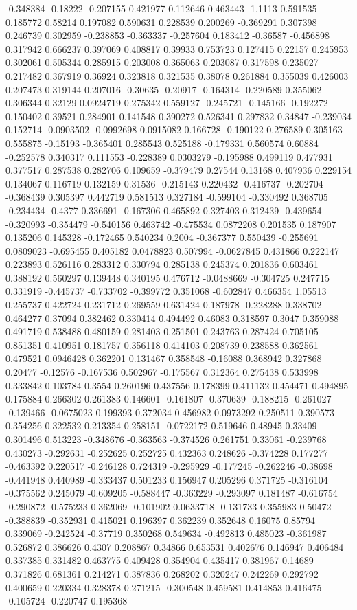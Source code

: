 -0.348384 -0.18222 -0.207155 0.421977 0.112646 0.463443 -1.1113 0.591535 0.185772 0.58214 0.197082 0.590631 0.228539 0.200269 -0.369291 0.307398 0.246739 0.302959 -0.238853 -0.363337 -0.257604 0.183412 -0.36587 -0.456898 0.317942 0.666237 0.397069 0.408817 0.39933 0.753723 0.127415 0.22157 0.245953 0.302061 0.505344 0.285915 0.203008 0.365063 0.203087 0.317598 0.235027 0.217482 0.367919 0.36924 0.323818 0.321535 0.38078 0.261884 0.355039 0.426003 0.207473 0.319144 0.207016 -0.30635 -0.20917 -0.164314 -0.220589 0.355062 0.306344 0.32129 0.0924719 0.275342 0.559127 -0.245721 -0.145166 -0.192272 0.150402 0.39521 0.284901 0.141548 0.390272 0.526341 0.297832 0.34847 -0.239034 0.152714 -0.0903502 -0.0992698 0.0915082 0.166728 -0.190122 0.276589 0.305163 0.555875 -0.15193 -0.365401 0.285543 0.525188 -0.179331 0.560574 0.60884 -0.252578 0.340317 0.111553 -0.228389 0.0303279 -0.195988 0.499119 0.477931 0.377517 0.287538 0.282706 0.109659 -0.379479 0.27544 0.13168 0.407936 0.229154 0.134067 0.116719 0.132159 0.31536 -0.215143 0.220432 -0.416737 -0.202704 -0.368439 0.305397 0.442719 0.581513 0.327184 -0.599104 -0.330492 0.368705 -0.234434 -0.4377 0.336691 -0.167306 0.465892 0.327403 0.312439 -0.439654 -0.320993 -0.354479 -0.540156 0.463742 -0.475534 0.0872208 0.201535 0.187907 0.135206 0.145328 -0.172465 0.540234 0.2004 -0.367377 0.550439 -0.255691 0.0809023 -0.695455 0.405182 0.0478823 0.507994 -0.0627845 0.431866 0.222147 0.223893 0.526116 0.283312 0.330794 0.285138 0.245374 0.201836 0.603461 0.388192 0.560297 0.139448 0.340195 0.476712 -0.0488669 -0.304725 0.247715 0.331919 -0.445737 -0.733702 -0.399772 0.351068 -0.602847 0.466354 1.05513 0.255737 0.422724 0.231712 0.269559 0.631424 0.187978 -0.228288 0.338702 0.464277 0.37094 0.382462 0.330414 0.494492 0.46083 0.318597 0.3047 0.359088 0.491719 0.538488 0.480159 0.281403 0.251501 0.243763 0.287424 0.705105 0.851351 0.410951 0.181757 0.356118 0.414103 0.208739 0.238588 0.362561 0.479521 0.0946428 0.362201 0.131467 0.358548 -0.16088 0.368942 0.327868 0.20477 -0.12576 -0.167536 0.502967 -0.175567 0.312364 0.275438 0.533998 0.333842 0.103784 0.3554 0.260196 0.437556 0.178399 0.411132 0.454471 0.494895 0.175884 0.266302 0.261383 0.146601 -0.161807 -0.370639 -0.188215 -0.261027 -0.139466 -0.0675023 0.199393 0.372034 0.456982 0.0973292 0.250511 0.390573 0.354256 0.322532 0.213354 0.258151 -0.0722172 0.519646 0.48945 0.33409 0.301496 0.513223 -0.348676 -0.363563 -0.374526 0.261751 0.33061 -0.239768 0.430273 -0.292631 -0.252625 0.252725 0.432363 0.248626 -0.374228 0.177277 -0.463392 0.220517 -0.246128 0.724319 -0.295929 -0.177245 -0.262246 -0.38698 -0.441948 0.440989 -0.333437 0.501233 0.156947 0.205296 0.371725 -0.316104 -0.375562 0.245079 -0.609205 -0.588447 -0.363229 -0.293097 0.181487 -0.616754 -0.290872 -0.575233 0.362069 -0.101902 0.0633718 -0.131733 0.355983 0.50472 -0.388839 -0.352931 0.415021 0.196397 0.362239 0.352648 0.16075 0.85794 0.339069 -0.242524 -0.37719 0.350268 0.549634 -0.492813 0.485023 -0.361987 0.526872 0.386626 0.4307 0.208867 0.34866 0.653531 0.402676 0.146947 0.406484 0.337385 0.331482 0.463775 0.409428 0.354904 0.435417 0.381967 0.14689 0.371826 0.681361 0.214271 0.387836 0.268202 0.320247 0.242269 0.292792 0.400659 0.220334 0.328378 0.271215 -0.300548 0.459581 0.414853 0.416475 -0.105724 -0.220747 0.195368 